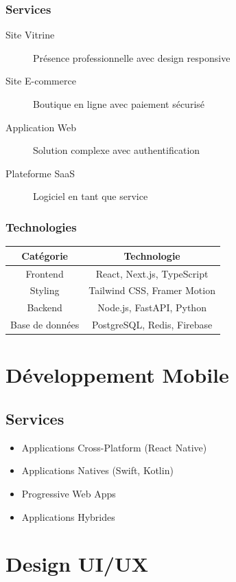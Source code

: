 \documentclass[12pt,a4paper,oneside]{book}
\begin{document}
\subsection{Services}
\begin{description}
\item[Site Vitrine] Présence professionnelle avec design responsive
\item[Site E-commerce] Boutique en ligne avec paiement sécurisé
\item[Application Web] Solution complexe avec authentification
\item[Plateforme SaaS] Logiciel en tant que service
\end{description}

\subsection{Technologies}
\bigskip
\begin{center}
\begin{tabular}{|c|c|}
\hline
\rowcolor{electronblue}
\color{white}\textbf{Catégorie} & \color{white}\textbf{Technologie} \\
\hline
Frontend & React, Next.js, TypeScript \\
\hline
Styling & Tailwind CSS, Framer Motion \\
\hline
Backend & Node.js, FastAPI, Python \\
\hline
Base de données & PostgreSQL, Redis, Firebase \\
\hline
\end{tabular}
\end{center}

\chapter{Développement Mobile}

\section{Services}
\begin{itemize}
\item Applications Cross-Platform (React Native)
\item Applications Natives (Swift, Kotlin)
\item Progressive Web Apps
\item Applications Hybrides
\end{itemize}

\chapter{Design UI/UX}
\end{document}
